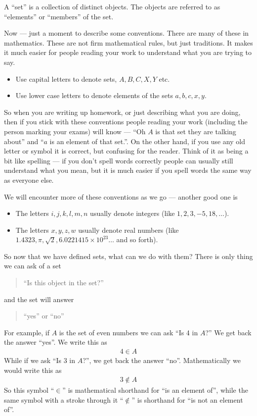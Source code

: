 \begin{defn}\label{def_0_2_1}
 A ``set'' is a collection of distinct objects. The objects are referred to as
``elements'' or ``members'' of the set.
\end{defn}

Now --- just a moment to describe some conventions. There are many of these in
mathematics. These are not firm mathematical rules, but just traditions. It
makes it much easier for people reading your work to understand what you are
trying to say.
\begin{itemize}
\item Use capital letters to denote sets, $A,B, C, X, Y$ etc.
\item Use lower case letters to denote elements of the sets $a,b,c,x,y$.
\end{itemize}
So when you are writing up homework, or just describing what you are
doing, then if you stick with these conventions people reading your work
(including the person marking your exams) will know --- ``Oh $A$ is that set
they are talking about'' and ``$a$ is an element of that set.''. On the other
hand, if you use any old letter or symbol it is correct, but confusing for the
reader. Think of it as being a bit like spelling --- if you don't spell words
correctly people can usually still understand what you mean, but it is much easier if
you spell words the same way as everyone else.

We will encounter more of these conventions as we go --- another good one is
\begin{itemize}
\item The letters $i,j,k,l,m,n$ usually denote integers (like
$1,2,3,-5,18,\dots$).
\item The letters $x,y,z,w$ usually denote real numbers (like $1.4323, \pi,
\sqrt{2}, 6.0221415\times 10^{23} \dots$ and so forth).
\end{itemize}

So now that we have defined sets, what can we do with them? There is only thing
we can ask of a set
\begin{quote}
``Is this object in the set?''
\end{quote}
and the set will answer
\begin{quote}
  ``yes'' or ``no''
\end{quote}
For example, if $A$ is the set of even numbers we can ask ``Is 4 in $A$?'' We
get back the answer ``yes''. We write this as
\begin{align*}
  4 \in A
\end{align*}
While if we ask  ``Is $3$ in $A$?'', we get back the answer ``no''.
Mathematically we would write this as
\begin{align*}
  3 \notin A
\end{align*}
So this symbol ``$\in$'' is mathematical shorthand for ``is an element of'',
while the same symbol with a stroke through it ``$\notin$'' is shorthand for
``is not an element of''.


